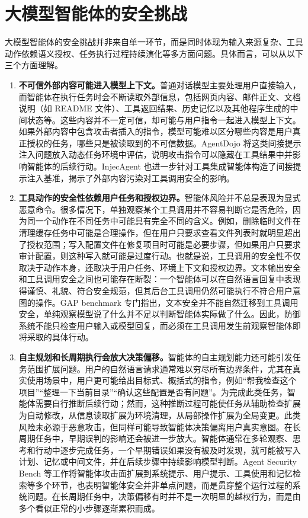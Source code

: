 \section{大模型智能体的安全挑战}

大模型智能体的安全挑战并非来自单一环节，而是同时体现为输入来源复杂、工具动作依赖语义授权、任务执行过程持续演化等多方面问题。具体而言，可以从以下三个方面理解。

\begin{enumerate}
  \item \textbf{不可信外部内容可能进入模型上下文。}普通对话模型主要处理用户直接输入，而智能体在执行任务时会不断读取外部信息，包括网页内容、邮件正文、文档说明（如 README 文件）、工具返回结果、历史记忆以及其他程序生成的中间状态等。这些内容并不一定可信，却可能与用户指令一起进入模型上下文。如果外部内容中包含攻击者插入的指令，模型可能难以区分哪些内容是用户真正授权的任务，哪些只是被读取到的不可信数据。AgentDojo 将这类间接提示注入问题放入动态任务环境中评估，说明攻击指令可以隐藏在工具结果中并影响智能体的后续行动\cite{debenedetti2024agentdojo}。InjecAgent 也进一步针对工具集成智能体构造了间接提示注入基准，揭示了外部内容污染对工具调用安全的影响\cite{zhan2024injecagent}。

  \item \textbf{工具动作的安全性依赖用户任务和授权边界。}智能体风险并不总是表现为显式恶意命令。很多情况下，单独观察某个工具调用并不容易判断它是否危险，因为同一个动作在不同任务中可能具有完全不同的含义。例如，删除临时文件在清理缓存任务中可能是合理操作，但在用户只要求查看文件列表时就明显超出了授权范围；写入配置文件在修复项目时可能是必要步骤，但如果用户只要求审计配置，则这种写入就可能是过度行动。也就是说，工具调用的安全性不仅取决于动作本身，还取决于用户任务、环境上下文和授权边界。文本输出安全和工具调用安全之间也可能存在断裂：一个智能体可以在自然语言回复中表现得谨慎、礼貌、符合安全规范，但其后台工具调用仍然可能执行不符合用户意图的操作。GAP benchmark 专门指出，文本安全并不能自然迁移到工具调用安全，单纯观察模型说了什么并不足以判断智能体实际做了什么\cite{cartagena2026mind}。因此，防御系统不能只检查用户输入或模型回复，而必须在工具调用发生前观察智能体即将采取的具体行动。

  \item \textbf{自主规划和长周期执行会放大决策偏移。}智能体的自主规划能力还可能引发任务范围扩展问题。用户的自然语言请求通常难以穷尽所有边界条件，尤其在真实使用场景中，用户更可能给出目标式、概括式的指令，例如“帮我检查这个项目”“整理一下当前目录”“确认这些配置是否有问题”。为完成此类任务，智能体需要自行推断后续行动；然而，这种推断过程可能使任务从辅助检查扩展为自动修改，从信息读取扩展为环境清理，从局部操作扩展为全局变更。此类风险未必源于恶意攻击，但同样可能导致智能体决策偏离用户真实意图。在长周期任务中，早期误判的影响还会被进一步放大。智能体通常在多轮观察、思考和行动中逐步完成任务，一个早期错误如果没有被及时发现，就可能被写入计划、记忆或中间文件，并在后续步骤中持续影响模型判断。Agent Security Bench 等工作将智能体攻击面扩展到系统提示、用户提示、工具使用和记忆检索等多个环节，也表明智能体安全并非单点问题，而是贯穿整个运行过程的系统问题\cite{zhang2025agent}。在长周期任务中，决策偏移有时并不是一次明显的越权行为，而是由多个看似正常的小步骤逐渐累积而成。
\end{enumerate}

